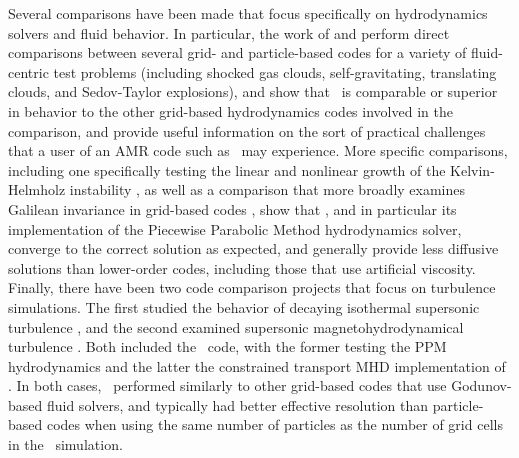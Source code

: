 Several comparisons have been made that focus specifically on
hydrodynamics solvers and fluid behavior.  In particular, the work of
\citet{2007MNRAS.380..963A} and \citet{Tasker2008} perform
direct comparisons between several grid- and particle-based
codes for a variety of fluid-centric test problems (including shocked gas clouds,
self-gravitating, translating clouds, and Sedov-Taylor explosions),
and show that \enzo\ is comparable or superior in behavior to the
other grid-based hydrodynamics codes involved in the comparison, and
provide useful information on the sort of practical challenges that a
user of an
AMR code such as \enzo\ may experience.  More specific comparisons, including one
specifically testing the linear and nonlinear growth of the
Kelvin-Helmholz instability \citep{2012ApJS..201...18M}, as well as a
comparison that more
broadly examines Galilean invariance in grid-based codes
\citep{2010MNRAS.401.2463R}, show that \enzo, and in particular its
implementation of the Piecewise Parabolic Method hydrodynamics solver,
converge to the correct solution as expected, and generally provide
less diffusive solutions than lower-order codes, including those that
use artificial viscosity.  Finally, there have been two code comparison
projects that focus on turbulence simulations.  The first studied the
behavior of decaying isothermal supersonic turbulence
\citep{2009A&A...508..541K}, and the second examined supersonic
magnetohydrodynamical turbulence \citep{2011ApJ...737...13K}.  Both
included the \enzo\ code, with the former testing the PPM
hydrodynamics and the latter the constrained transport MHD
implementation of \citet{Collins10}.  In both cases, \enzo\ performed similarly to other
grid-based codes that use Godunov-based fluid solvers, and typically
had better effective resolution than particle-based codes when using the
same number of particles as the number of grid cells in the \enzo\ simulation.

